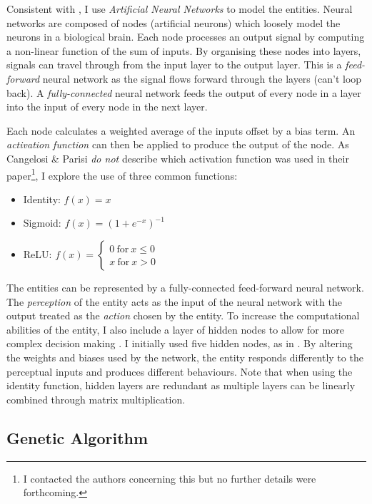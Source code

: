 \documentclass[12pt,a4paper]{report}
\begin{document}
Consistent with \citet{Cangelosi1998}, I use \emph{Artificial Neural Networks} to model the entities. Neural networks are composed of nodes (artificial neurons) which loosely model the neurons in a biological brain. Each node processes an output signal by computing a non-linear function of the sum of inputs. By organising these nodes into layers, signals can travel through from the input layer to the output layer. This is a \emph{feed-forward} neural network as the signal flows forward through the layers (can't loop back). A \emph{fully-connected} neural network feeds the output of every node in a layer into the input of every node in the next layer. 

Each node calculates a weighted average of the inputs offset by a bias term. An \emph{activation function} can then be applied to produce the output of the node. As Cangelosi \& Parisi \emph{do not} describe which activation function was used in their paper\footnote{I contacted the authors concerning this but no further details were forthcoming.}, I explore the use of three common functions:

\begin{itemize}
	\item Identity: $f(x) = x$
	\item Sigmoid: $f(x) = (1+e^{-x})^{-1}$
	\item ReLU: $ f(x) = 
    \left\{
        \begin{array}{ll}
          0~\mathrm{for}~x \leq 0 \\
          x~\mathrm{for}~x > 0
        \end{array}
      \right.
      $
\end{itemize}

The entities can be represented by a fully-connected feed-forward neural network. The  \emph{perception} of the entity acts as the input of the neural network with the output treated as the \emph{action} chosen by the entity. To increase the computational abilities of the entity, I also include a layer of hidden nodes to allow for more complex decision making \citep{de1993backpropagation}. I initially used five hidden nodes, as in \citet{Cangelosi1998}. By altering the weights and biases used by the network, the entity responds differently to the perceptual inputs and produces different behaviours. Note that when using the identity function, hidden layers are redundant as multiple layers can be linearly combined through matrix multiplication.

\subsection{Genetic Algorithm}\label{section:genetic}
\end{document}
